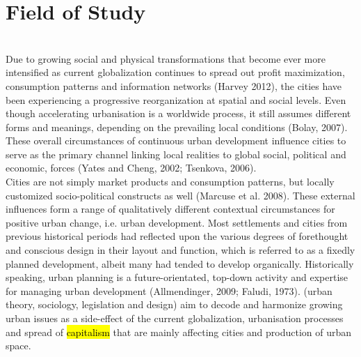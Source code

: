 \documentclass[11pt]{report}
\begin{document}
\section{Field of Study}
\\
Due to growing social and physical transformations that become ever more intensified as current globalization continues to spread out profit maximization, consumption patterns and information networks (Harvey 2012), the cities have been experiencing a progressive reorganization at spatial and social levels. Even though accelerating urbanisation is a worldwide process, it still assumes different forms and meanings, depending on the prevailing local conditions (Bolay, 2007). These overall circumstances of continuous urban development influence cities to serve as the primary channel linking local realities to global social, political and economic, forces (Yates and Cheng, 2002; Tsenkova, 2006).
\\
Cities are not simply market products and consumption patterns, but locally customized socio-political constructs as well (Marcuse et al. 2008). These external influences form a range of qualitatively different contextual circumstances for positive urban change, i.e. urban development. Most settlements and cities from previous historical periods had reflected upon the various degrees of forethought and conscious design in their layout and function, which is referred to as a fixedly planned development, albeit many had tended to develop organically. Historically speaking, urban planning is a future-orientated, top-down activity and expertise for managing urban development (Allmendinger, 2009; Faludi, 1973).   (urban theory,  sociology,  legislation and  design) aim  to decode and harmonize growing urban issues as a side-effect of the current globalization, urbanisation processes and spread of \hl{capitalism} that are mainly affecting cities and production of urban space. 
\\
\end{document}
